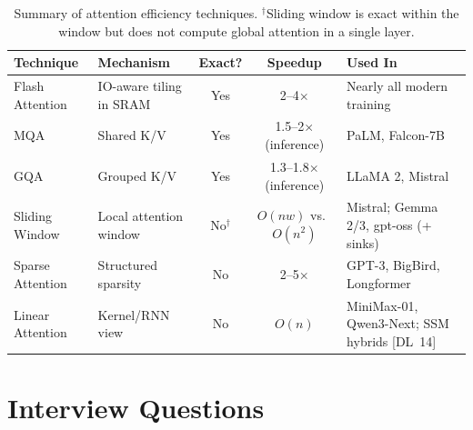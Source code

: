 \begin{table}[H]
\centering
\small
\begin{tabularx}{\textwidth}{@{}l l c c X@{}}
\toprule
\textbf{Technique} & \textbf{Mechanism} & \textbf{Exact?} & \textbf{Speedup} & \textbf{Used In} \\
\midrule
Flash Attention  & IO-aware tiling in SRAM  & Yes & 2--4$\times$ & Nearly all modern training \\
MQA              & Shared K/V              & Yes & 1.5--2$\times$ (inference) & PaLM, Falcon-7B \\
GQA              & Grouped K/V             & Yes & 1.3--1.8$\times$ (inference) & LLaMA 2, Mistral \\
Sliding Window   & Local attention window   & No$^\dagger$ & $O(nw)$ vs.\ $O(n^2)$ & Mistral; Gemma 2/3, gpt-oss (+ sinks) \\
Sparse Attention & Structured sparsity     & No  & 2--5$\times$ & GPT-3, BigBird, Longformer \\
Linear Attention & Kernel/RNN view         & No  & $O(n)$ & MiniMax-01, Qwen3-Next; SSM hybrids [DL~14] \\
\bottomrule
\end{tabularx}
\caption{Summary of attention efficiency techniques.  $^\dagger$Sliding window is
exact within the window but does not compute global attention in a single layer.}
\label{tab:efficiency-summary}
\end{table}


\section{Interview Questions}
\label{sec:transformer-questions}

